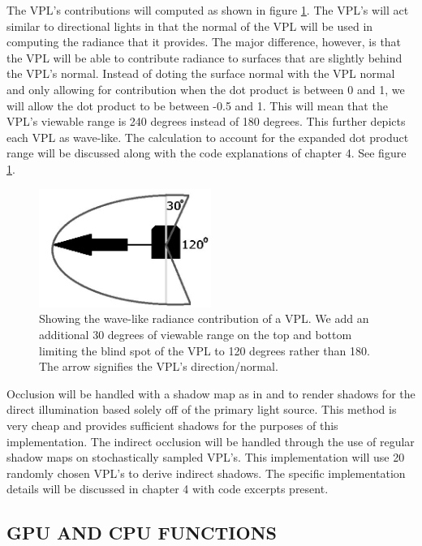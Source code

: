 The VPL's contributions will computed as shown in figure \ref{fig:3.6}.  The VPL's will act similar to directional lights in that the normal of the VPL will be used in computing the radiance that it provides.  The major difference, however, is that the VPL will be able to contribute radiance to surfaces that are slightly behind the VPL's normal.  Instead of doting the surface normal with the VPL normal and only allowing for contribution when the dot product is between 0 and 1, we will allow the dot product to be between -0.5 and 1.  This will mean that the VPL's viewable range is 240 degrees instead of 180 degrees.  This further depicts each VPL as wave-like.  The calculation to account for the expanded dot product range will be discussed along with the code explanations of chapter 4.  See figure \ref{fig:3.6}.

\begin{figure}[h!]
  \centering
    \includegraphics[width=0.5\textwidth]{Figure36_gray.jpg}
  \caption{Showing the wave-like radiance contribution of a VPL. We add an additional 30 degrees of viewable range on the top and bottom limiting the blind spot of the VPL to 120 degrees rather than 180. The arrow signifies the VPL's direction/normal.}
	\label{fig:3.6}
\end{figure}

Occlusion will be handled with a shadow map as in \cite{Williams1978} and \cite{Reeves1987} to render shadows for the direct illumination based solely off of the primary light source.  This method is very cheap and provides sufficient shadows for the purposes of this implementation.  The indirect occlusion will be handled through the use of regular shadow maps on stochastically sampled VPL's.  This implementation will use 20 randomly chosen VPL's to derive indirect shadows.  The specific implementation details will be discussed in chapter 4 with code excerpts present.

\subsection{GPU AND CPU FUNCTIONS}

